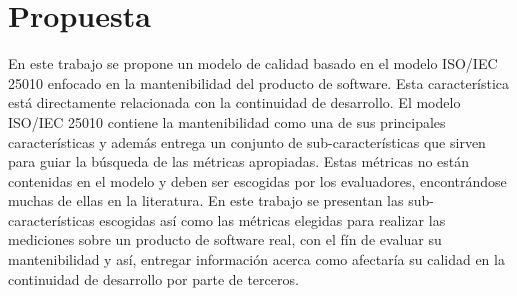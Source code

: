 
\chapter{Propuesta}
En este trabajo se propone un modelo de calidad basado en el modelo ISO/IEC 25010
enfocado en la mantenibilidad del producto de software. Esta característica está
directamente relacionada con la continuidad de desarrollo.
El modelo ISO/IEC 25010 contiene la mantenibilidad como una de sus principales
características y además entrega un conjunto de sub-características que sirven para
guiar la búsqueda de las métricas apropiadas.
Estas métricas no están contenidas en el modelo y deben ser escogidas por los evaluadores, 
encontrándose muchas de ellas en la literatura.
En este trabajo se presentan las sub-características escogidas así como las 
métricas elegidas para realizar las mediciones sobre un producto de software real, 
con el fín de evaluar su mantenibilidad y así, entregar información acerca como afectaría
su calidad en la continuidad de desarrollo por parte de terceros.
